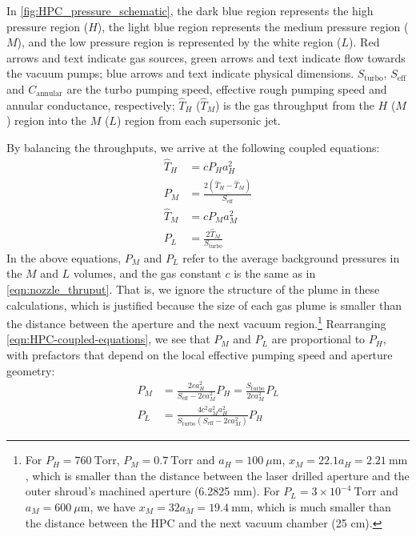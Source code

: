 In \cref{fig:HPC_pressure_schematic}, the dark blue region represents the high pressure region ($H$), the light blue region represents the medium pressure region ($M$), and the low pressure region is represented by the white region ($L$). Red arrows and text indicate gas sources, green arrows and text indicate flow towards the vacuum pumps; blue arrows and text indicate physical dimensions. $S_{\textrm{turbo}}$, $S_{\textrm{eff}}$ and $C_{\textrm{annular}}$ are the turbo pumping speed, effective rough pumping speed and annular conductance, respectively; $\hat{T}_H$ ($\hat{T}_M$) is the gas throughput from the $H$ ($M$) region into the $M$ ($L$) region from each supersonic jet.

By balancing the throughputs, we arrive at the following coupled equations:
\begin{equation}
\begin{aligned}
\hat{T}_H &= c P_H a_H^2 \\
P_M &= \frac{2(\hat{T}_H-\hat{T}_M)}{S_{\textrm{eff}}} \\
\hat{T}_M &= c P_M a_M^2 \\
P_L &= \frac{2 \hat{T}_M}{S_{\textrm{turbo}}}
\end{aligned}
\label{eqn:HPC-coupled-equations}
\end{equation}
In the above equations, $P_M$ and $P_L$ refer to the average background pressures in the $M$ and $L$ volumes, and the gas constant $c$ is the same as in \cref{eqn:nozzle_thruput}. That is, we ignore the structure of the plume in these calculations, which is justified because the size of each gas plume is smaller than the distance between the aperture and the next vacuum region.\footnote{For $P_H = 760 \ \textrm{Torr}$, $P_M = 0.7 \ \textrm{Torr}$ and $a_H = 100 \ \mu \textrm{m}$, $x_M = 22.1 a_H = 2.21 \ \textrm{mm}$, which is smaller than the distance between the laser drilled aperture and the outer shroud's machined aperture (6.2825 mm). For $P_L = 3 \times 10^{-4} \ \textrm{Torr}$ and $a_M = 600 \ \mu \textrm{m}$, we have $x_M = 32 a_M = 19.4 \ \textrm{mm}$, which is much smaller than the distance between the HPC and the next vacuum chamber (25 cm).} Rearranging \cref{eqn:HPC-coupled-equations}, we see that $P_M$ and $P_L$ are proportional to $P_H$, with prefactors that depend on the local effective pumping speed and aperture geometry:
\begin{equation}
\begin{aligned}
P_M &=  \frac{2 c a_H^2}{S_{\textrm{eff}}-2 c a_M^2} P_H  = \frac{S_{\textrm{turbo}}}{2 c a_M^2} P_L \\
P_L &= \frac{4 c^2 a_M^2 a_H^2 }{S_{\textrm{turbo}} (S_{\textrm{eff}} - 2 c a_M^2)} P_H
\end{aligned}
\label{eqn:HPC-PM-PL}
\end{equation}

